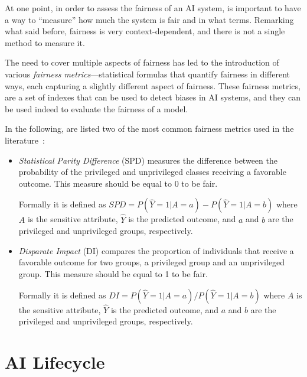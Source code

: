 \documentclass[12pt,a4paper,openright,twoside]{book}
\begin{document}
At one point, in order to assess the fairness of an \ac{AI} system, is important to have a way to ``measure'' how much the system is fair and in what terms.
%
Remarking what said before, fairness is very context-dependent, and there is not a single method to measure it. 


The need to cover multiple aspects of fairness has led to the introduction of various \textit{fairness metrics}---statistical formulas that quantify fairness in different ways, each capturing a slightly different aspect of fairness.
%
These fairness metrics, are a set of indexes that can be used to detect biases in \ac{AI} systems, and they can be used indeed to evaluate the fairness of a model.
%


In the following, are listed two of the most common fairness metrics used in the literature~\cite{DBLP:conf/bias/IrfanML23}:

\begin{itemize}
    \item \textit{Statistical Parity Difference} (SPD)
    \missingref
    measures the difference between the probability of the privileged and unprivileged classes receiving a favorable outcome. This measure should be equal to 0 to be fair.
    
    Formally it is defined as $SPD = P(\hat{Y} = 1 | A = a) - P(\hat{Y} = 1 | A = b)$
    where $A$ is the sensitive attribute, $\hat{Y}$ is the predicted outcome, and $a$ and $b$ are the privileged and unprivileged groups, respectively.
    
    \item \textit{Disparate Impact} (DI)
    \missingref
    compares the proportion of individuals that receive a favorable outcome for two groups, a privileged group and an unprivileged group. This measure should be equal to 1 to be fair.
    
    Formally it is defined as $DI = P(\hat{Y} = 1 | A = a) / P(\hat{Y} = 1 | A = b)$
    where $A$ is the sensitive attribute, $\hat{Y}$ is the predicted outcome, and $a$ and $b$ are the privileged and unprivileged groups, respectively.    
\end{itemize}


\section{\acs{AI} Lifecycle}
\end{document}

